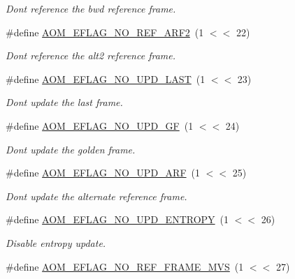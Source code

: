 \begin{DoxyCompactItemize}
\begin{DoxyCompactList}\small\item\em Don\textquotesingle{}t reference the bwd reference frame. \end{DoxyCompactList}\item 
\#define \hyperlink{group__aom__encoder_gad04799a74215e1b9609f7ccd1766f8c9}{A\+O\+M\+\_\+\+E\+F\+L\+A\+G\+\_\+\+N\+O\+\_\+\+R\+E\+F\+\_\+\+A\+R\+F2}~(1 $<$$<$ 22)
\begin{DoxyCompactList}\small\item\em Don\textquotesingle{}t reference the alt2 reference frame. \end{DoxyCompactList}\item 
\#define \hyperlink{group__aom__encoder_ga7a55a46970c074b761319c5c46d87b6e}{A\+O\+M\+\_\+\+E\+F\+L\+A\+G\+\_\+\+N\+O\+\_\+\+U\+P\+D\+\_\+\+L\+A\+ST}~(1 $<$$<$ 23)
\begin{DoxyCompactList}\small\item\em Don\textquotesingle{}t update the last frame. \end{DoxyCompactList}\item 
\#define \hyperlink{group__aom__encoder_gaa81cc31f95fd463f51a158050d267a36}{A\+O\+M\+\_\+\+E\+F\+L\+A\+G\+\_\+\+N\+O\+\_\+\+U\+P\+D\+\_\+\+GF}~(1 $<$$<$ 24)
\begin{DoxyCompactList}\small\item\em Don\textquotesingle{}t update the golden frame. \end{DoxyCompactList}\item 
\#define \hyperlink{group__aom__encoder_ga469b4cf5ff76cb30de951e129c25a786}{A\+O\+M\+\_\+\+E\+F\+L\+A\+G\+\_\+\+N\+O\+\_\+\+U\+P\+D\+\_\+\+A\+RF}~(1 $<$$<$ 25)
\begin{DoxyCompactList}\small\item\em Don\textquotesingle{}t update the alternate reference frame. \end{DoxyCompactList}\item 
\#define \hyperlink{group__aom__encoder_gac5a69f04b0bc88f755587a1da815d754}{A\+O\+M\+\_\+\+E\+F\+L\+A\+G\+\_\+\+N\+O\+\_\+\+U\+P\+D\+\_\+\+E\+N\+T\+R\+O\+PY}~(1 $<$$<$ 26)
\begin{DoxyCompactList}\small\item\em Disable entropy update. \end{DoxyCompactList}\item 
\#define \hyperlink{group__aom__encoder_ga31943c4d9e34f90a0691949109c224fd}{A\+O\+M\+\_\+\+E\+F\+L\+A\+G\+\_\+\+N\+O\+\_\+\+R\+E\+F\+\_\+\+F\+R\+A\+M\+E\+\_\+\+M\+VS}~(1 $<$$<$ 27)

\end{DoxyCompactItemize}
